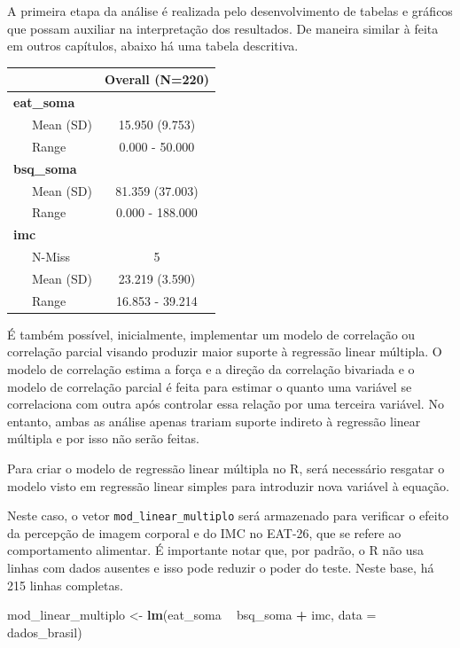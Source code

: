 \documentclass[
]{book}
\newenvironment{Shaded}{\begin{snugshade}}{\end{snugshade}}
\newcommand{\DataTypeTok}[1]{\textcolor[rgb]{0.13,0.29,0.53}{#1}}
\newcommand{\KeywordTok}[1]{\textcolor[rgb]{0.13,0.29,0.53}{\textbf{#1}}}
\newcommand{\NormalTok}[1]{#1}
\newcommand{\OperatorTok}[1]{\textcolor[rgb]{0.81,0.36,0.00}{\textbf{#1}}}
\newcommand{\StringTok}[1]{\textcolor[rgb]{0.31,0.60,0.02}{#1}}
\begin{document}
A primeira etapa da análise é realizada pelo desenvolvimento de tabelas e gráficos que possam auxiliar na interpretação dos resultados. De maneira similar à feita em outros capítulos, abaixo há uma tabela descritiva.

\begin{Shaded}
\end{Shaded}

\begin{longtable}[]{@{}lc@{}}
\toprule
& Overall (N=220)\tabularnewline
\midrule
\endhead
\textbf{eat\_soma} &\tabularnewline
~~~Mean (SD) & 15.950 (9.753)\tabularnewline
~~~Range & 0.000 - 50.000\tabularnewline
\textbf{bsq\_soma} &\tabularnewline
~~~Mean (SD) & 81.359 (37.003)\tabularnewline
~~~Range & 0.000 - 188.000\tabularnewline
\textbf{imc} &\tabularnewline
~~~N-Miss & 5\tabularnewline
~~~Mean (SD) & 23.219 (3.590)\tabularnewline
~~~Range & 16.853 - 39.214\tabularnewline
\bottomrule
\end{longtable}

É também possível, inicialmente, implementar um modelo de correlação ou correlação parcial visando produzir maior suporte à regressão linear múltipla. O modelo de correlação estima a força e a direção da correlação bivariada e o modelo de correlação parcial é feita para estimar o quanto uma variável se correlaciona com outra após controlar essa relação por uma terceira variável. No entanto, ambas as análise apenas trariam suporte indireto à regressão linear múltipla e por isso não serão feitas.

Para criar o modelo de regressão linear múltipla no R, será necessário resgatar o modelo visto em regressão linear simples para introduzir nova variável à equação.

Neste caso, o vetor \texttt{mod\_linear\_multiplo} será armazenado para verificar o efeito da percepção de imagem corporal e do IMC no EAT-26, que se refere ao comportamento alimentar. É importante notar que, por padrão, o R não usa linhas com dados ausentes e isso pode reduzir o poder do teste. Neste base, há 215 linhas completas.

\begin{Shaded}
\begin{Highlighting}[]
\NormalTok{mod_linear_multiplo <-}\StringTok{ }\KeywordTok{lm}\NormalTok{(eat_soma }\OperatorTok{~}\StringTok{ }\NormalTok{bsq_soma }\OperatorTok{+}\StringTok{ }\NormalTok{imc, }\DataTypeTok{data =}\NormalTok{ dados_brasil)}
\end{Highlighting}
\end{Shaded}
\end{document}
